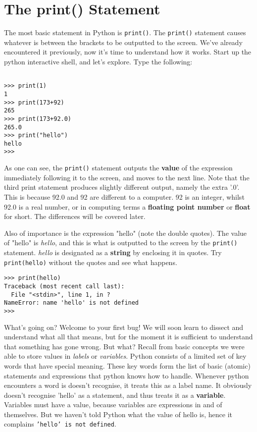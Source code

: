 \section{The print() Statement}

The most basic statement in Python is \texttt{print()}. The \texttt{print()}   statement causes whatever is between the brackets to be outputted to the screen.   We've already encountered it previously, now it's time to understand   how it works. Start up the python interactive shell, and let's explore.   Type the following:
\begin{lstlisting}

>>> print(1)
1
>>> print(173+92)
265
>>> print(173+92.0)
265.0
>>> print("hello")
hello
>>>
\end{lstlisting}

As one can see, the \texttt{print()} statement outputs the   \textbf{value} of the expression immediately following it to   the screen, and moves to the next line. Note that the third print   statement produces slightly different output, namely the extra '.0'.   This is because 92.0 and 92 are different to a computer. 92 is an   integer, whilst 92.0 is a real number, or in computing terms a   \textbf{floating point number} or \textbf{float} for short. The   differences will be covered later.

Also of importance is the expression "hello" (note the double   quotes). The value of "hello" is \textit{hello}, and this is what is   outputted to the screen by the \texttt{print()} statement. \textit{hello} is   designated as a \textbf{string} by enclosing it in quotes. Try   
\texttt{print(hello)} without the quotes and see what happens.
\begin{lstlisting}
>>> print(hello)
Traceback (most recent call last):
  File "<stdin>", line 1, in ?
NameError: name 'hello' is not defined
>>>
\end{lstlisting}

What's going on? Welcome to your first bug! We will soon learn to dissect and   understand what all that means, but for the moment it is sufficient to   understand that something has gone wrong. But what? Recall from basic   concepts we were able to store values in \textit{labels} or \textit{variables}.   Python consists of a limited set of key words that have special   meaning. These key words form the list of basic (atomic) statements and   expressions that python knows how to handle. Whenever python encounters   a word is doesn't recognise, it treats this as a label name. It   obviously doesn't recognise 'hello' as a statement, and thus treats it as   a \textbf{variable}. Variables must have a value, because   variables are expressions in and of themselves. But we haven't told   Python what the value of hello is, hence it complains \texttt{'hello' is not defined}.

